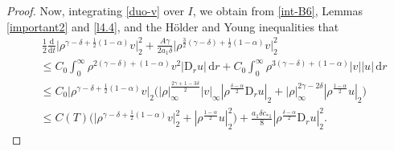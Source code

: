 \documentclass[11pt,reqno]{amsart}
\numberwithin{rk}{section}
\numberwithin{prop}{section}
\numberwithin{mydef}{section}
\numberwithin{lem}{section}
\numberwithin{equation}{section}
\numberwithin{thm}{section}
\begin{document}
\begin{proof}
Now, integrating \eqref{duo-v} over $I$, we obtain from \eqref{int-B6}, Lemmas \ref{important2} and \ref{l4.4}, and the H\"older and Young inequalities that
\begin{equation}\label{new-v-0}
\begin{aligned}
&\,\frac{1}{2}\frac{\mathrm{d}}{\mathrm{d}t}\big|\rho^{\gamma-\delta+\frac{1}{2}(1-\alpha)}v\big|_2^2+ \frac{A\gamma}{2a_1\delta} \big|\rho^{\frac{3}{2}(\gamma-\delta)+\frac{1}{2}(1-\alpha)}v\big|_2^2\\
&\leq C_0 \int_0^\infty \rho^{2(\gamma-\delta)+(1-\alpha)} v^2 |\mathrm{D}_r u| \,\mathrm{d}r +C_0\int_0^\infty\rho^{3(\gamma-\delta)+(1-\alpha)} |v||u|\,\mathrm{d}r\\
&\leq  C_0\big|\rho^{\gamma-\delta+\frac{1}{2}(1-\alpha)}v\big|_2\Big(|\rho|_\infty^\frac{2\gamma+1-3\delta}{2}|v|_\infty |\rho^\frac{\delta-\alpha}{2}\mathrm{D}_r u|_2+ |\rho|_\infty^{2\gamma-2\delta} |\rho^\frac{1-\alpha}{2}u|_2\Big)\\
&\leq  C(T)\big(\big|\rho^{\gamma-\delta+\frac{1}{2}(1-\alpha)}v\big|_2^2+|\rho^\frac{1-\alpha}{2}u|_2^2\big)+\frac{a_1\delta c_{*1}}{8} |\rho^\frac{\delta-\alpha}{2}\mathrm{D}_r u|_2^2. 
\end{aligned}        
\end{equation}




\end{proof}
\end{document}
